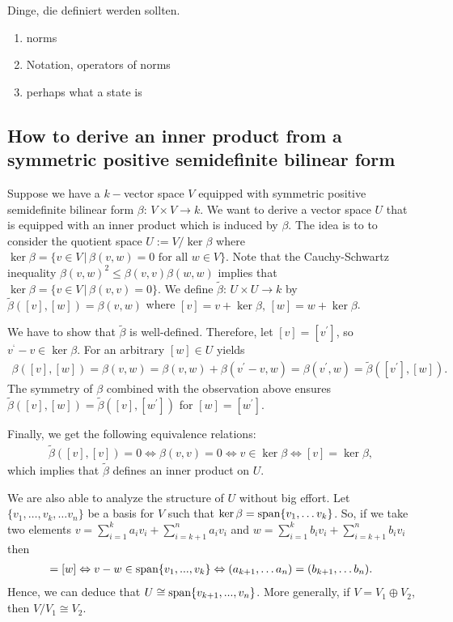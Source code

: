Dinge, die definiert werden sollten. 
\begin{enumerate}
	\item norms
	\item Notation, operators of norms 
	\item  perhaps what a state is 
\end{enumerate}


\subsection{How to derive an inner product from a symmetric positive semidefinite bilinear form}
Suppose we have a $ k- $vector space $ V $ equipped with symmetric positive semidefinite bilinear form $ \beta: \, V \times V \to k $. We want to derive a vector space $ U $ that is equipped with an inner product which is induced by $ \beta $. The idea is to to consider the quotient space $ U:=V/\ker\beta $ where $ \ker \beta = \{ v \in V \, | \, \beta(v,w)= 0 \text{ for all } w \in V \} $. Note that the Cauchy-Schwartz inequality $ \beta(v,w)^2 \le \beta(v,v)\beta(w,w) $ implies that 
$ \ker \beta = \{ v \in V \, | \, \beta(v,v)= 0 \} $.
We define $ \tilde{\beta}:  \, U \times U \to k $ by $ \tilde{\beta}([v],[w]) = \beta(v,w) $ where $ [v] = v + \ker\beta, \,$$[w]=w+\ker\beta$.

We have to show that $ \tilde{\beta} $ is well-defined. Therefore, let $ [v]=[v^{\prime}] $, so $v^{‘}-v \in \ker \beta $. 
For an arbitrary $ [w] \in U $ yields 
\begin{align*}
	\beta([v],[w]) = \beta(v,w) = \beta(v,w)+\beta(v^{\prime}-v,w)= \beta(v^{\prime},w) = \tilde{\beta}([v^{\prime}],[w]).
\end{align*}
The symmetry of $ \beta $ combined with the observation above ensures $ \tilde{\beta}([v],[w]) = \tilde{\beta}([v],[w^{\prime}]) $ for $ [w]= [w^{\prime}] $.

Finally, we get the following equivalence relations: 
\begin{align*}
	\tilde{\beta}([v],[v]) = 0 \Leftrightarrow \beta(v,v) = 0 \Leftrightarrow v \in \ker \beta \Leftrightarrow [v]= \ker \beta,
\end{align*}
which implies that $ \tilde{\beta} $ defines an inner product on $ U $. 

We are also able to analyze the structure of $ U $ without big effort. Let $ \{ v_1,\hdots,v_k, \hdots v_n \} $ be a basis for $ V $ such that $ \ker \beta = \textup{span} \{ v_1,\hdots v_k \}$. So, if we take two elements 
$ v = \sum_{i=1}^{k}a_iv_i + \sum_{i=k+1}^{n}a_iv_i$ and $ w = \sum_{i=1}^{k}b_iv_i + \sum_{i=k+1}^{n}b_iv_i $ then 
\begin{align*}
	[v] = [w] \Leftrightarrow v-w \in \textup{span} \{  v_1,...,v_k \} \Leftrightarrow (a_{k+1},\hdots a_n) = (b_{k+1},\hdots b_n).
\end{align*} 
Hence, we can deduce that $ U \cong \textup{span} \{ v_{k+1},...,v_n \} $. More generally, if $ V = V_1 \oplus V_2 $, then $ V/V_1 \cong V_2 $.